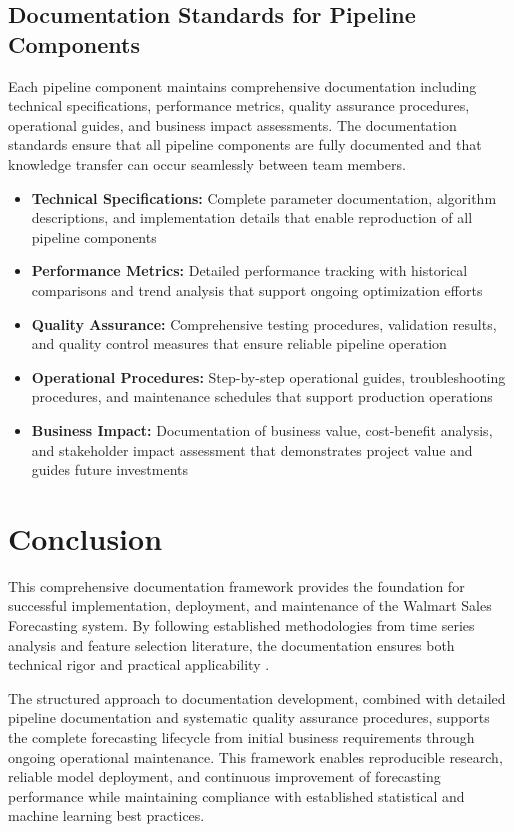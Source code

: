 		\subsection{Documentation Standards for Pipeline Components}
		
		Each pipeline component maintains comprehensive documentation including technical specifications, performance metrics, quality assurance procedures, operational guides, and business impact assessments. The documentation standards ensure that all pipeline components are fully documented and that knowledge transfer can occur seamlessly between team members.
		
		\begin{itemize}
			\item \textbf{Technical Specifications:} Complete parameter documentation, algorithm descriptions, and implementation details that enable reproduction of all pipeline components
			\item \textbf{Performance Metrics:} Detailed performance tracking with historical comparisons and trend analysis that support ongoing optimization efforts
			\item \textbf{Quality Assurance:} Comprehensive testing procedures, validation results, and quality control measures that ensure reliable pipeline operation
			\item \textbf{Operational Procedures:} Step-by-step operational guides, troubleshooting procedures, and maintenance schedules that support production operations
			\item \textbf{Business Impact:} Documentation of business value, cost-benefit analysis, and stakeholder impact assessment that demonstrates project value and guides future investments
		\end{itemize}
		
		\section{Conclusion}
		
		This comprehensive documentation framework provides the foundation for successful implementation, deployment, and maintenance of the Walmart Sales Forecasting system. By following established methodologies from time series analysis and feature selection literature, the documentation ensures both technical rigor and practical applicability \cite{Box:2016}\cite{Montgomery:2008}\cite{Guyon:2003}.
		
		The structured approach to documentation development, combined with detailed pipeline documentation and systematic quality assurance procedures, supports the complete forecasting lifecycle from initial business requirements through ongoing operational maintenance. This framework enables reproducible research, reliable model deployment, and continuous improvement of forecasting performance while maintaining compliance with established statistical and machine learning best practices.
		
